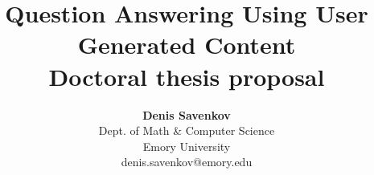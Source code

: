 \documentclass[12pt]{report}
\begin{document}
% 

\setlength{\headsep}{0.15in}
\setlength{\topmargin}{-.5in}
\pagestyle{empty}



\title{
\textbf{Question Answering Using User Generated Content} \\
\normalfont Doctoral thesis proposal}
\author{\textbf{Denis Savenkov}\\
      Dept. of Math \& Computer Science\\
      Emory University\\
      denis.savenkov@emory.edu
}


\mydate

\maketitle
\end{document}

